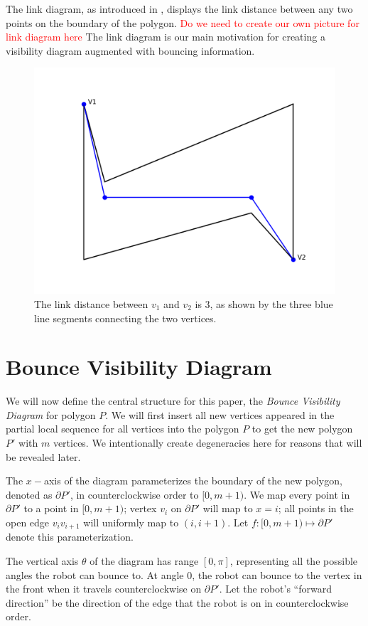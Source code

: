 \documentclass[letterpaper, 10 pt, conference]{ieeeconf}  %
\begin{document}
The link diagram, as introduced in \cite{tan_sweep}, displays the link distance between any two points on the boundary of the polygon. \textcolor{red}{Do we need to create our own picture for link diagram here} The link diagram is our main motivation for creating a visibility diagram augmented with bouncing information.
\begin{figure}
    \includegraphics[width=0.6\linewidth]{images/link_distance.png}
    \centering
    \caption{The link distance between $v_1$ and $v_2$ is 3, as shown by the three blue line segments connecting the two vertices.}\label{fig:link_dis}
    \centering
\end{figure}

\section{Bounce Visibility Diagram}
We will now define the central structure for this paper, the \textit{Bounce Visibility Diagram} for polygon $P$. We will first insert all new vertices appeared in the partial local sequence for all vertices into the polygon $P$ to get the new polygon $P'$ with $m$ vertices. We intentionally create degeneracies here for reasons that will be revealed later.

The $x-$axis of the diagram parameterizes the boundary of the new polygon, denoted as $\partial P'$, in counterclockwise order to  $[0, m+1)$. We map every point in $\partial P'$ to a point in $[0, m+1)$; vertex $v_i$ on $\partial P'$ will map to $x = i$; all points in the open edge $v_iv_{i+1}$ will uniformly map to $(i, i+1)$. Let $f: [0, m+1)\mapsto \partial P'$ denote this parameterization. 

The vertical axis $\theta$ of the diagram has range $[0, \pi]$, representing all the possible angles the robot can bounce to. At angle $0$, the robot can bounce to the vertex in the front when it travels counterclockwise on $\partial P'$. Let the robot's ``forward direction'' be the direction of the edge that the robot is on in counterclockwise order. 
\end{document}
